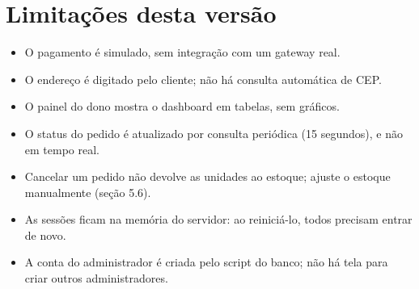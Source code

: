 \documentclass[12pt]{article}
\begin{document}
\section{Limitações desta versão}

\begin{itemize}
\item O pagamento é simulado, sem integração com um gateway real.
\item O endereço é digitado pelo cliente; não há consulta automática de CEP.
\item O painel do dono mostra o dashboard em tabelas, sem gráficos.
\item O status do pedido é atualizado por consulta periódica (15 segundos), e não em tempo real.
\item Cancelar um pedido não devolve as unidades ao estoque; ajuste o estoque manualmente (seção 5.6).
\item As sessões ficam na memória do servidor: ao reiniciá-lo, todos precisam entrar de novo.
\item A conta do administrador é criada pelo script do banco; não há tela para criar outros administradores.
\end{itemize}
\end{document}
